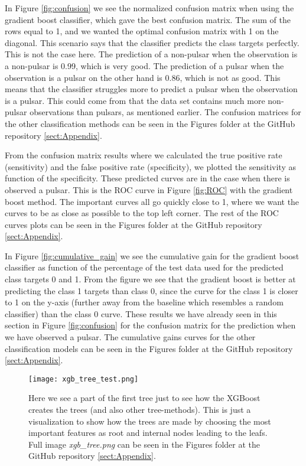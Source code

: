 \documentclass[12pt,a4paper,english]{article}
\begin{document}
In Figure \ref{fig:confusion} we see the normalized confusion matrix when using the gradient boost classifier, which gave the best confusion matrix. The sum of the rows equal to 1, and we wanted the optimal confusion matrix with 1 on the diagonal. This scenario says that the classifier predicts the class targets perfectly. This is not the case here. The prediction of a non-pulsar when the observation is a non-pulsar is 0.99, which is very good. The prediction of a pulsar when the observation is a pulsar on the other hand is 0.86, which is not as good. This means that the classifier struggles more to predict a pulsar when the observation is a pulsar. This could come from that the data set contains much more non-pulsar observations than pulsars, as mentioned earlier. The confusion matrices for the other classification methods can be seen in the Figures folder at the GitHub repository \ref{sect:Appendix}.

From the confusion matrix results where we calculated the true positive rate (sensitivity) and the false positive rate (specificity), we plotted the sensitivity as function of the specificity. These predicted curves are in the case when there is observed a pulsar. This is the ROC curve in Figure \ref{fig:ROC} with the gradient boost method. The important curves all go quickly close to 1, where we want the curves to be as close as possible to the top left corner. The rest of the ROC curves plots can be seen in the Figures folder at the GitHub repository \ref{sect:Appendix}.

In Figure \ref{fig:cumulative_gain} we see the cumulative gain for the gradient boost classifier as function of the percentage of the test data used for the predicted class targets 0 and 1. From the figure we see that the gradient boost is better at predicting the class 1 targets than class 0, since the curve for the class 1 is closer to 1 on the y-axis (further away from the baseline which resembles a random classifier) than the class 0 curve. These results we have already seen in this section in Figure \ref{fig:confusion} for the confusion matrix for the prediction when we have observed a pulsar. The cumulative gains curves for the other classification models can be seen in the Figures folder at the GitHub repository \ref{sect:Appendix}.

\begin{figure}[htbp!]
	\centering\texttt{[image: xgb\_tree\_test.png]}
	\caption{Here we see a part of the first tree just to see how the XGBoost creates the trees (and also other tree-methods). This is just a visualization to show how the trees are made by choosing the most important features as root and internal nodes leading to the leafs. Full image \textit{xgb\_tree.png} can be seen in the Figures folder at the GitHub repository \ref{sect:Appendix}. \label{fig:tree}}
\end{figure} 
\end{document}
